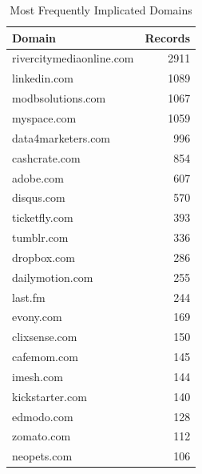 \begin{table}

\caption{\label{tab:domain_dat}Most Frequently Implicated Domains}
\centering
\begin{tabular}[t]{lr}
\toprule
Domain & Records\\
\midrule
rivercitymediaonline.com & 2911\\
linkedin.com & 1089\\
modbsolutions.com & 1067\\
myspace.com & 1059\\
data4marketers.com & 996\\
\addlinespace
cashcrate.com & 854\\
adobe.com & 607\\
disqus.com & 570\\
ticketfly.com & 393\\
tumblr.com & 336\\
\addlinespace
dropbox.com & 286\\
dailymotion.com & 255\\
last.fm & 244\\
evony.com & 169\\
clixsense.com & 150\\
\addlinespace
cafemom.com & 145\\
imesh.com & 144\\
kickstarter.com & 140\\
edmodo.com & 128\\
zomato.com & 112\\
\addlinespace
neopets.com & 106\\
\bottomrule
\end{tabular}
\end{table}
